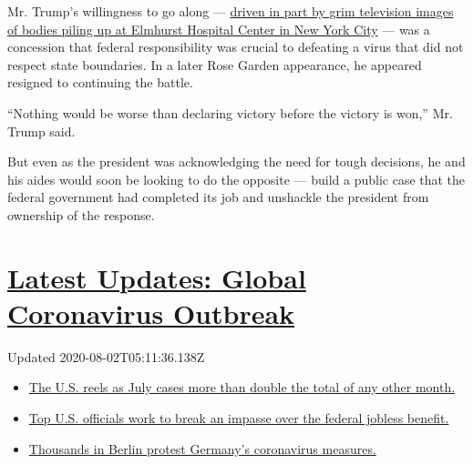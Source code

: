 Mr. Trump's willingness to go along ---
\href{https://www.nytimes.com/2020/03/30/us/politics/trump-coronavirus.html}{driven
in part by grim television images of bodies piling up at Elmhurst
Hospital Center in New York City} --- was a concession that federal
responsibility was crucial to defeating a virus that did not respect
state boundaries. In a later Rose Garden appearance, he appeared
resigned to continuing the battle.

``Nothing would be worse than declaring victory before the victory is
won,'' Mr. Trump said.

But even as the president was acknowledging the need for tough
decisions, he and his aides would soon be looking to do the opposite ---
build a public case that the federal government had completed its job
and unshackle the president from ownership of the response.

\hypertarget{latest-updates-global-coronavirus-outbreak}{%
\section{\texorpdfstring{\href{https://www.nytimes.com/2020/08/01/world/coronavirus-covid-19.html?action=click\&pgtype=Article\&state=default\&region=MAIN_CONTENT_1\&context=storylines_live_updates}{Latest
Updates: Global Coronavirus
Outbreak}}{Latest Updates: Global Coronavirus Outbreak}}\label{latest-updates-global-coronavirus-outbreak}}

Updated 2020-08-02T05:11:36.138Z

\begin{itemize}
\tightlist
\item
  \href{https://www.nytimes.com/2020/08/01/world/coronavirus-covid-19.html?action=click\&pgtype=Article\&state=default\&region=MAIN_CONTENT_1\&context=storylines_live_updates\#link-34047410}{The
  U.S. reels as July cases more than double the total of any other
  month.}
\item
  \href{https://www.nytimes.com/2020/08/01/world/coronavirus-covid-19.html?action=click\&pgtype=Article\&state=default\&region=MAIN_CONTENT_1\&context=storylines_live_updates\#link-780ec966}{Top
  U.S. officials work to break an impasse over the federal jobless
  benefit.}
\item
  \href{https://www.nytimes.com/2020/08/01/world/coronavirus-covid-19.html?action=click\&pgtype=Article\&state=default\&region=MAIN_CONTENT_1\&context=storylines_live_updates\#link-25930521}{Thousands
  in Berlin protest Germany's coronavirus measures.}
\end{itemize}

